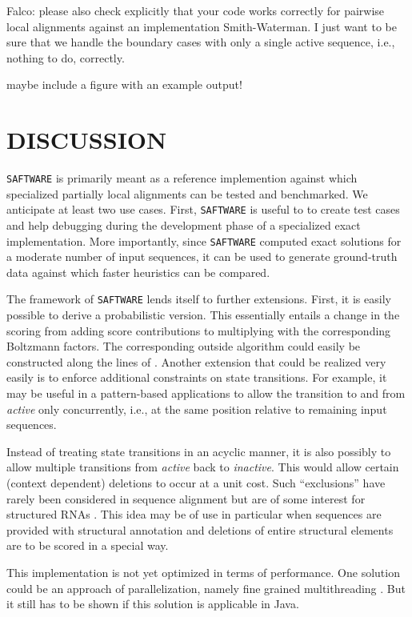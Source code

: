 \documentclass[a4paper,10pt]{article}
\newcommand{\TODO}[1]{\begingroup\color{red}#1\endgroup}
\newcommand{\PFS}[1]{\begingroup\color{green}#1\endgroup}
\newcommand{\FK}[1]{\begingroup\color{blue}#1\endgroup}
\newcommand{\SAFTWARE}{\TODO{\texttt{SAFTWARE}}}
\begin{document}
\TODO{Falco: please also check explicitly that your code works correctly
  for pairwise local alignments against an implementation Smith-Waterman.
  I just want to be sure that we handle the boundary cases with only a
  single active sequence, i.e., nothing to do, correctly.} 

\TODO{maybe include a figure with an example output!} 

\section{\uppercase{Discussion}}

\PFS{%
\SAFTWARE{} is primarily meant as a reference implemention against which
specialized partially local alignments can be tested and benchmarked. We
anticipate at least two use cases. First, \SAFTWARE{} is useful to to
create test cases and help debugging during the development phase of a
specialized exact implementation. More importantly, since \SAFTWARE{}
computed exact solutions for a moderate number of input sequences, it can
be used to generate ground-truth data against which faster heuristics can
be compared. 

The framework of \SAFTWARE{} lends itself to further extensions. First, it
is easily possible to derive a probabilistic version. This essentially
entails a change in the scoring from adding score contributions to
multiplying with the corresponding Boltzmann factors. The corresponding
outside algorithm could easily be constructed along the lines of
\cite{Hoener:15b}. Another extension that could be realized very easily is
to enforce additional constraints on state transitions. For example, it may
be useful in a pattern-based applications to allow the transition to and
from \textit{active} only concurrently, i.e., at the same position relative
to remaining input sequences.

Instead of treating state transitions in an acyclic manner, it is also
possibly to allow multiple transitions from \textit{active} back to
\textit{inactive}. This would allow certain (context dependent) deletions
to occur at a unit cost. Such ``exclusions'' have rarely been considered in
sequence alignment but are of some interest for structured RNAs
\cite{Schirmer:13}. This idea may be of use in particular when sequences
are provided with structural annotation and deletions of entire structural
elements are to be scored in a special way.
}

\FK{
This implementation is not yet optimized in terms of performance. One solution could be an approach of parallelization, namely fine grained multithreading \cite{Martins:01}. But it still has to be shown if this solution is applicable in Java.}
\end{document}
